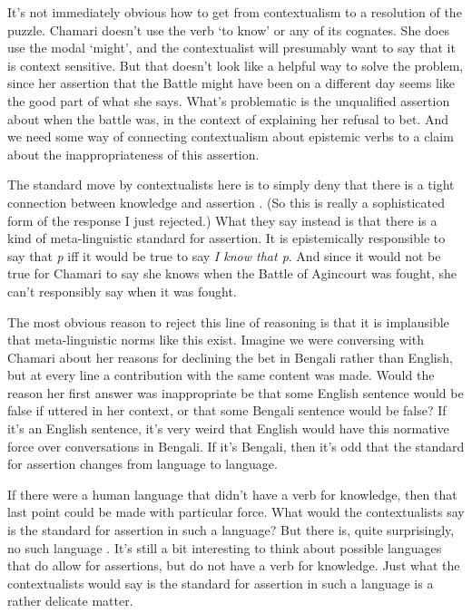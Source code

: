 \documentclass[
  11pt,
]{book}
\begin{document}
It's not immediately obvious how to get from contextualism to a resolution of the puzzle. Chamari doesn't use the verb `to know' or any of its cognates. She does use the modal `might', and the contextualist will presumably want to say that it is context sensitive. But that doesn't look like a helpful way to solve the problem, since her assertion that the Battle might have been on a different day seems like the good part of what she says. What's problematic is the unqualified assertion about when the battle was, in the context of explaining her refusal to bet. And we need some way of connecting contextualism about epistemic verbs to a claim about the inappropriateness of this assertion.

The standard move by contextualists here is to simply deny that there is a tight connection between knowledge and assertion \citep{DeRose2002, Cohen2004}. (So this is really a sophisticated form of the response I just rejected.) What they say instead is that there is a kind of meta-linguistic standard for assertion. It is epistemically responsible to say that \emph{p} iff it would be true to say \emph{I know that p}. And since it would not be true for Chamari to say she knows when the Battle of Agincourt was fought, she can't responsibly say when it was fought.

The most obvious reason to reject this line of reasoning is that it is implausible that meta-linguistic norms like this exist. Imagine we were conversing with Chamari about her reasons for declining the bet in Bengali rather than English, but at every line a contribution with the same content was made. Would the reason her first answer was inappropriate be that some English sentence would be false if uttered in her context, or that some Bengali sentence would be false? If it's an English sentence, it's very weird that English would have this normative force over conversations in Bengali. If it's Bengali, then it's odd that the standard for assertion changes from language to language.

If there were a human language that didn't have a verb for knowledge, then that last point could be made with particular force. What would the contextualists say is the standard for assertion in such a language? But there is, quite surprisingly, no such language \citep{Nagel2014}. It's still a bit interesting to think about possible languages that do allow for assertions, but do not have a verb for knowledge. Just what the contextualists would say is the standard for assertion in such a language is a rather delicate matter.
\end{document}
